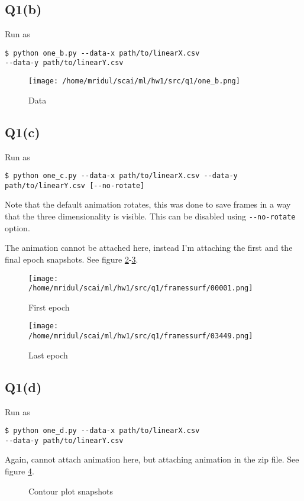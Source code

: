 \documentclass[11pt]{article}
\begin{document}
\subsection{Q1(b)}
\label{sec:org2e4e985}
\begin{codebox}
Run as
\begin{verbatim}
$ python one_b.py --data-x path/to/linearX.csv
--data-y path/to/linearY.csv
\end{verbatim}
\end{codebox}
\begin{figure}[!ht]
\centering
\texttt{[image: /home/mridul/scai/ml/hw1/src/q1/one\_b.png]}
\caption{\label{fig:org2bc820c}Data}
\end{figure}
\subsection{Q1(c)}
\label{sec:org2afdae8}
\begin{codebox}
Run as
\begin{verbatim}
$ python one_c.py --data-x path/to/linearX.csv --data-y
path/to/linearY.csv [--no-rotate]
\end{verbatim}
Note that the default animation rotates, this was done to
save frames in a way that the three dimensionality is
visible. This can be disabled using \verb|--no-rotate|
option.\par
\end{codebox}
\noindent The animation cannot be attached here, instead I'm attaching the first
and the final epoch snapshots. See figure \ref{fig:org1c0d57c}-\ref{fig:orgc4a9d5e}.
\begin{figure}[!ht]
\centering
\texttt{[image: /home/mridul/scai/ml/hw1/src/q1/framessurf/00001.png]}
\caption{\label{fig:org1c0d57c}First epoch}
\end{figure}
\begin{figure}[!ht]
\centering
\texttt{[image: /home/mridul/scai/ml/hw1/src/q1/framessurf/03449.png]}
\caption{\label{fig:orgc4a9d5e}Last epoch}
\end{figure}
\afterpage{\clearpage}
\subsection{Q1(d)}
\label{sec:org9368090}
\begin{codebox}
Run as
\begin{verbatim}
$ python one_d.py --data-x path/to/linearX.csv
--data-y path/to/linearY.csv
\end{verbatim}
\end{codebox}
\noindent Again, cannot attach animation here, but attaching animation in the
zip file. See figure \ref{fig:contours}.
\begin{figure}[!ht]
\centering
	\caption{\label{fig:contours}Contour plot snapshots}
\end{figure}
\end{document}

